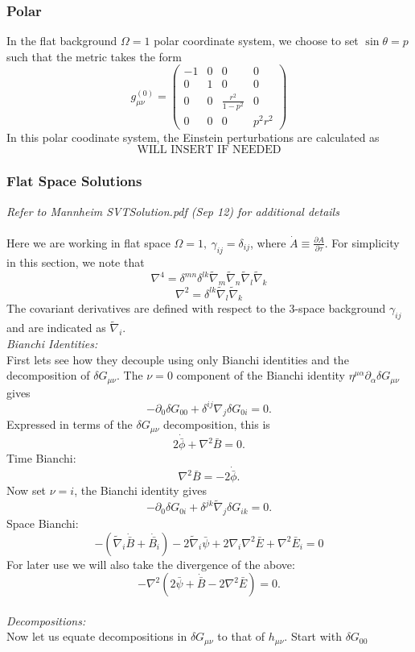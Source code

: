 \documentclass[10pt,letterpaper]{article}
\newcommand{\be}{\begin{equation}} %
\newcommand{\ee}{\end{equation}} %
\newcommand{\del}{\nabla} %
\newcommand{\bpm}{\begin{pmatrix}} %
\newcommand{\epm}{\end{pmatrix}} %
\newcommand{\pd}{\partial}
\numberwithin{equation}{section}
\begin{document}
\subsubsection{Polar}
In the flat background $\Omega = 1$ polar coordinate system, we choose to set $\sin\theta = p$ such that the metric takes the form
\be
	g^{(0)}_{\mu\nu} = \bpm -1 & 0 & 0 & 0 \\ 0 & 1 & 0 & 0\\ 0 & 0& \frac{r^2}{1-p^2} & 0\\ 0&0&0&p^2r^2 \epm
\ee
In this polar coodinate system, the Einstein perturbations are calculated as
\be
	\text{WILL INSERT IF NEEDED}
\ee
\subsubsection{Flat Space Solutions}
\emph{Refer to Mannheim SVTSolution.pdf (Sep 12) for additional details}
\\ \\
Here we are working in flat space $\Omega = 1,\ \gamma_{ij} = \delta_{ij}$, where $\dot A \equiv \frac{\pd A}{\pd \tau}$. For simplicity in this section, we note that
\[
	\del^4 =\delta^{mn}\delta^{lk}\tilde\del_m\tilde\del_n\tilde\del_l\tilde\del_k
\]
\[
	\del^2 = \delta^{lk}\tilde\del_l\tilde\del_k
\]
The covariant derivatives are defined with respect to the 3-space background $\gamma_{ij}$ and are indicated as $\tilde \del_i$.
\\ 
\noindent \textit{Bianchi Identities:}
\\
First lets see how they decouple using only Bianchi identities and the decomposition of $\delta G_{\mu\nu}$. The $\nu = 0$ component of the Bianchi identity $\eta^{\mu\alpha}\pd_\alpha \delta G_{\mu\nu}$ gives
\be
	-\pd_0 \delta G_{00} +\delta^{ij}\del_j \delta G_{0i} = 0.
\ee
Expressed in terms of the $\delta G_{\mu\nu}$ decomposition, this is
\be
	2\dot{\bar\phi} + \del^2\bar B = 0.
\ee
Time Bianchi:
\be
	\boxed{\del^2 \bar B = -2\dot{\bar \phi}}.
\ee
Now set $\nu = i$, the Bianchi identity gives
\be
	-\pd_0 \delta G_{0i} + \delta^{jk} \tilde\del_j \delta G_{ik} =0.
\ee
Space Bianchi:
\be
	\boxed{-(\tilde\del_i \dot{\bar B} + \dot{\bar{ B_i}}) -2 \tilde\del_i \bar{\psi} + 2 \del_i \del^2 \bar E + \del^2 \bar E_i =0 }
\ee
For later use we will also take the divergence of the above:
\be
	-\del^2 (2\bar\psi +\dot{\bar B} - 2\del^2 \bar E)=0.
\ee
\\ 
\textit{Decompositions:}\\
Now let us equate decompositions in $\delta G_{\mu\nu}$ to that of $h_{\mu\nu}$. Start with $\delta G_{00}$
\end{document}
